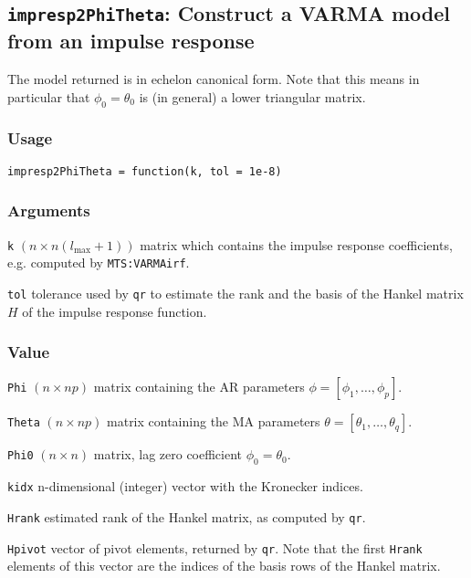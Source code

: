 \documentclass[]{article}
\begin{document}
\subsection{\texorpdfstring{\texttt{impresp2PhiTheta}: Construct a VARMA
model from an impulse
response}{impresp2PhiTheta: Construct a VARMA model from an impulse response}}\label{impresp2phitheta-construct-a-varma-model-from-an-impulse-response}

The model returned is in echelon canonical form. Note that this means in
particular that \(\phi_0=\theta_0\) is (in general) a lower triangular
matrix.

\subsubsection*{Usage}\begin{verbatim}
impresp2PhiTheta = function(k, tol = 1e-8)
\end{verbatim}\subsubsection*{Arguments}\begin{description}
\item \texttt{k} $(n \times n(l_{\mbox{max}}+1))$ matrix which contains the impulse 
          response coefficients, e.g. computed by \texttt{MTS:VARMAirf}.
\item \texttt{tol} tolerance used by \texttt{qr} to estimate the rank and
          the basis of the Hankel matrix $H$ of the impulse response function.
\end{description}\subsubsection*{Value}\begin{description}
\item \texttt{Phi} $(n \times np)$ matrix containing the AR parameters
       $\phi = [\phi_1,\ldots,\phi_p]$.
\item \texttt{Theta} $(n \times np)$ matrix containing the MA parameters
       $\theta = [\theta_1,\ldots,\theta_q]$.
\item \texttt{Phi0} $(n \times n)$ matrix, lag zero coefficient $\phi_0=\theta_0$.
\item \texttt{kidx} n-dimensional (integer) vector with the Kronecker indices.
\item \texttt{Hrank} estimated rank of the Hankel matrix, as computed by
        \texttt{qr}.
\item \texttt{Hpivot} vector of pivot elements, returned by \texttt{qr}. 
       Note that the first \texttt{Hrank} elements of this vector are the 
       indices of the basis rows of the Hankel matrix.
\end{description}
\end{document}
